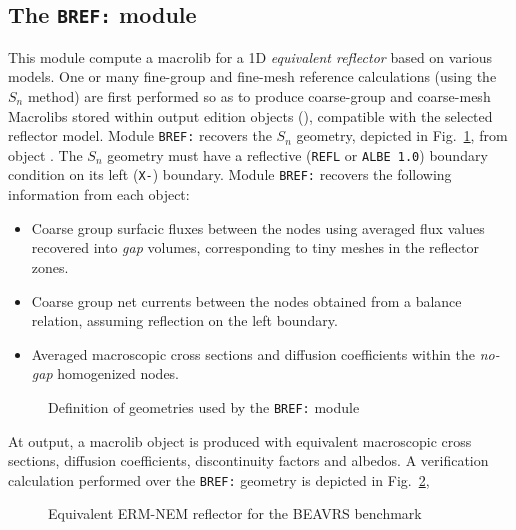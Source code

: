 \subsection{The {\tt BREF:} module}\label{sect:BREFData}

This module compute a {\sc macrolib} for a 1D {\sl equivalent reflector} based on various models. One or many fine-group and
fine-mesh reference calculations (using the $S_n$ method) are first performed so as to produce coarse-group and
coarse-mesh Macrolibs stored within output {\sc edition} objects (), compatible with the selected
reflector model. Module {\tt BREF:} recovers the $S_n$ {\sc geometry}, depicted in Fig.~\ref{fig:bref}, from object .
The $S_n$ {\sc geometry} must have a reflective ({\tt REFL} or {\tt ALBE 1.0}) boundary condition on its left ({\tt X-}) boundary.
Module {\tt BREF:} recovers the following information from each  object:
\begin{itemize}
\item Coarse group surfacic fluxes between the nodes using averaged flux values recovered into {\sl gap} volumes, corresponding to
tiny meshes in the reflector zones.
\item Coarse group net currents between the nodes obtained from a balance relation, assuming reflection on the left
boundary.
\item Averaged macroscopic cross sections and diffusion coefficients within the {\sl no-gap} homogenized nodes.
\end{itemize}

\begin{figure}[h!]
\begin{center} 
\epsfxsize=11cm
\centerline{ }
\parbox{14cm}{\caption{Definition of geometries used by the {\tt BREF:} module}
\label{fig:bref}} 
\end{center} 
\end{figure}

At output, a {\sc macrolib} object is produced with equivalent macroscopic cross sections, diffusion coefficients, discontinuity factors and
albedos. A verification calculation performed over the {\tt BREF:} geometry is depicted in Fig.~\ref{fig:brefVerif},

\begin{figure}[h!]
\begin{center} 
\epsfxsize=15cm
\centerline{ }
\parbox{14cm}{\caption{Equivalent ERM-NEM reflector for the BEAVRS benchmark}
\label{fig:brefVerif}} 
\end{center} 
\end{figure}

